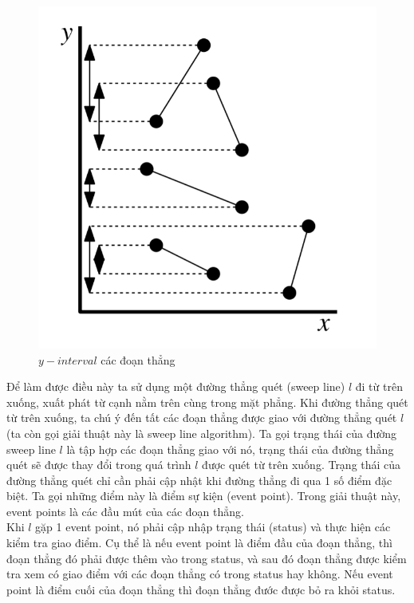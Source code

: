 \documentclass[15pt]{article}
\begin{document}
\begin{figure}[h!]
\centering
\includegraphics[scale=0.36]{./y_interval.png}
\caption{$y-interval$ các đoạn thẳng}
\label{fig:y-interval}
\end{figure}

Để làm được điều này ta sử dụng một đường thẳng quét (sweep line) $l$ đi từ trên xuống, xuất phát từ cạnh nằm trên cùng trong mặt phẳng. Khi đường thẳng quét từ trên xuống, ta chú ý đến tất các đoạn thẳng được giao với đường thẳng quét $l$ (ta còn gọi giải thuật này là sweep line algorithm). Ta gọi trạng thái của đường sweep line $l$ là tập hợp các đoạn thẳng giao với nó, trạng thái của đường thẳng quét sẽ được thay đổi trong quá trình $l$ được quét từ trên xuống. Trạng thái của đường thẳng quét chỉ cần phải cập nhật khi đường thẳng đi qua 1 số điểm đặc biệt. Ta gọi những điểm này là điểm sự kiện (event point). Trong giải thuật này, event points là các đầu mút của các đoạn thẳng. \\

Khi $l$ gặp 1 event point, nó phải cập nhập trạng thái (status) và thực hiện các kiểm tra giao điểm. Cụ thể là nếu event point là điểm đầu của đoạn thẳng, thì đoạn thẳng đó phải được thêm vào trong status, và sau đó đoạn thẳng được kiểm tra xem có giao điểm với các đoạn thẳng có trong status hay không. Nếu event point là điểm cuối của đoạn thẳng thì đoạn thẳng đước được bỏ ra khỏi status. \\
\end{document}
